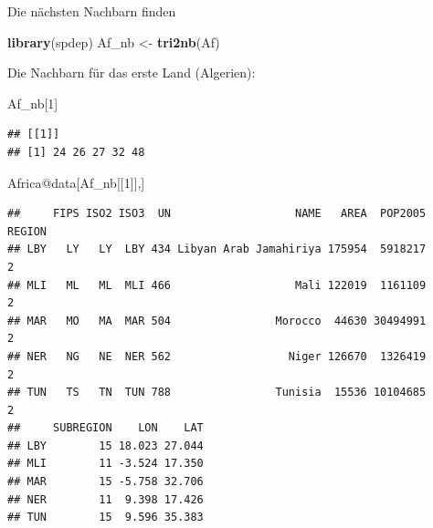 \documentclass[ignorenonframetext,]{beamer}
\newenvironment{Shaded}{\begin{snugshade}}{\end{snugshade}}
\newcommand{\DecValTok}[1]{\textcolor[rgb]{0.27,0.67,0.26}{#1}}
\newcommand{\KeywordTok}[1]{\textcolor[rgb]{0.26,0.66,0.93}{\textbf{#1}}}
\newcommand{\NormalTok}[1]{\textcolor[rgb]{0.74,0.68,0.62}{#1}}
\newcommand{\OperatorTok}[1]{\textcolor[rgb]{0.74,0.68,0.62}{#1}}
\newcommand{\StringTok}[1]{\textcolor[rgb]{0.02,0.61,0.04}{#1}}
\begin{document}
\begin{frame}[fragile]{Die nächsten Nachbarn finden}
\protect\hypertarget{die-nachsten-nachbarn-finden}{}

\begin{Shaded}
\begin{Highlighting}[]
\KeywordTok{library}\NormalTok{(spdep)}
\NormalTok{Af_nb <-}\StringTok{ }\KeywordTok{tri2nb}\NormalTok{(Af)}
\end{Highlighting}
\end{Shaded}

Die Nachbarn für das erste Land (Algerien):

\begin{Shaded}
\begin{Highlighting}[]
\NormalTok{Af_nb[}\DecValTok{1}\NormalTok{]}
\end{Highlighting}
\end{Shaded}

\begin{verbatim}
## [[1]]
## [1] 24 26 27 32 48
\end{verbatim}

\begin{Shaded}
\begin{Highlighting}[]
\NormalTok{Africa}\OperatorTok{@}\NormalTok{data[Af_nb[[}\DecValTok{1}\NormalTok{]],]}
\end{Highlighting}
\end{Shaded}

\begin{verbatim}
##     FIPS ISO2 ISO3  UN                   NAME   AREA  POP2005 REGION
## LBY   LY   LY  LBY 434 Libyan Arab Jamahiriya 175954  5918217      2
## MLI   ML   ML  MLI 466                   Mali 122019  1161109      2
## MAR   MO   MA  MAR 504                Morocco  44630 30494991      2
## NER   NG   NE  NER 562                  Niger 126670  1326419      2
## TUN   TS   TN  TUN 788                Tunisia  15536 10104685      2
##     SUBREGION    LON    LAT
## LBY        15 18.023 27.044
## MLI        11 -3.524 17.350
## MAR        15 -5.758 32.706
## NER        11  9.398 17.426
## TUN        15  9.596 35.383
\end{verbatim}

\end{frame}
\end{document}
